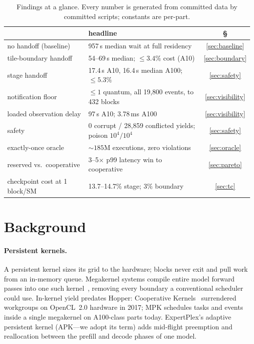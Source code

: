 \documentclass[11pt]{article}
\newcommand{\us}{\,\textmu s\xspace}
\begin{document}
\begin{table}[t]
  \centering
  \caption{Findings at a glance. Every number is generated from
  committed data by committed scripts; constants are per-part.}
  \label{tab:glance}
  \begin{tabular}{llc}
    \toprule
    & headline & \S \\
    \midrule
    no handoff (baseline) & 957\us{} median wait at full residency & \ref{sec:baseline} \\
    tile-boundary handoff & 54--69\us{} median; ${\le}3.4\%$ cost (A10) & \ref{sec:boundary} \\
    stage handoff & 17.4\us{} A10, 16.4\us{} median A100; ${\le}5.3\%$ & \ref{sec:safety} \\
    notification floor & ${\le}1$ quantum, all 19{,}800 events, to 432 blocks & \ref{sec:visibility} \\
    loaded observation delay & 97\us{} A10; 3.78\,ms A100 & \ref{sec:visibility} \\
    safety & 0 corrupt / 28{,}859 conflicted yields; poison $10^4/10^4$ & \ref{sec:safety} \\
    exactly-once oracle & ${\sim}185$M executions, zero violations & \ref{sec:oracle} \\
    reserved vs.\ cooperative & 3--5$\times$ p99 latency win to cooperative & \ref{sec:pareto} \\
    checkpoint cost at 1 block/SM & 13.7--14.7\% stage; 3\% boundary & \ref{sec:tc} \\
    \bottomrule
  \end{tabular}
\end{table}

\section{Background}

\paragraph{Persistent kernels.} A persistent kernel sizes its grid to
the hardware; blocks never exit and pull work from an in-memory
queue. Megakernel systems compile entire model forward passes into
one such kernel~\cite{mpk}, removing every boundary a conventional
scheduler could use. In-kernel yield predates Hopper: Cooperative
Kernels~\cite{coopkernels} surrendered workgroups on OpenCL~2.0
hardware in 2017; MPK schedules tasks and events inside a single
megakernel on A100-class parts today. ExpertPlex's adaptive
persistent kernel (APK---we adopt its term) adds mid-flight
preemption and reallocation between the prefill and decode phases of
one model.
\end{document}
